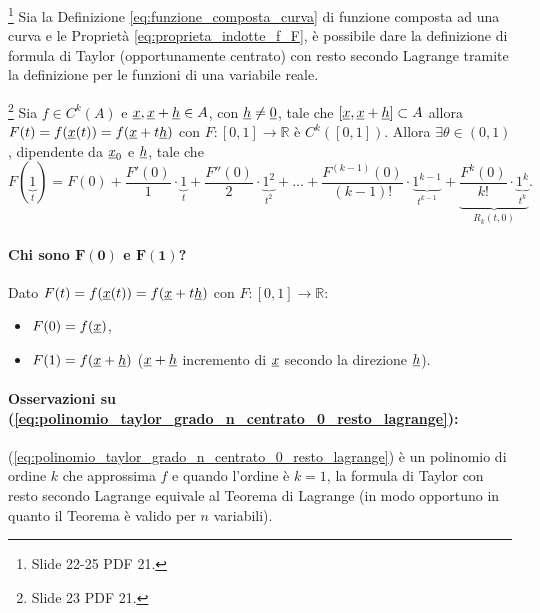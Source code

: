 \footnote{Slide 22-25 PDF 21.}
Sia la Definizione \ref{eq:funzione_composta_curva} di funzione composta ad una curva e le Proprietà \ref{eq:proprieta_indotte_f_F}, è possibile dare la definizione di formula di Taylor (opportunamente centrato) con resto secondo Lagrange tramite la definizione per le funzioni di una variabile reale.

\begin{definition}\footnote{Slide 23 PDF 21.}
	Sia $f\in C^k(A)$ e $\uline x, \uline x+\uline h\in A$, con $\uline h\neq\uline 0$, tale che $[\uline x, \uline x+\uline h] \subset A$ allora $F(t)=f(\uline x(t))=f(\uline x+t\uline h)$ con $F:[0,1]\rightarrow\mathbb{R}$ è $C^k([0,1])$. Allora $\exists\theta\in(0,1)$, dipendente da $\uline x_0$ e $\uline h$, tale che
	\begin{equation}\label{eq:polinomio_taylor_grado_n_centrato_0_resto_lagrange}
		F(\underbrace{1}_t) = F(0) + \frac{F'(0)}{1}\cdot \underbrace{1}_t + \frac{F''(0)}{2}\cdot \underbrace{1^2}_{t^2}  + \hdots + \frac{F^{(k-1)}(0)}{(k-1)!}\cdot \underbrace{1^{k-1}}_{t^{k-1}} + \underbrace{\frac{F^k(0)}{k!}\cdot \underbrace{1^k}_{t^{k}}}_{R_k(t,0)}.
	\end{equation}
\end{definition}
\paragraph{Chi sono $\boldsymbol{F(0)}$ e $\boldsymbol{F(1)}$?} Dato $F(t)=f(\uline x(t))=f(\uline x+t\uline h)$ con $F:[0,1]\rightarrow\mathbb{R}$:
\begin{itemize}
	\item $F(0)=f(\uline x)$,
	\item $F(1)=f(\uline x+\uline h)$ ($\uline x+\uline h$ incremento di $\uline x$ secondo la direzione $\uline h$).
\end{itemize}

\paragraph{Osservazioni su (\ref{eq:polinomio_taylor_grado_n_centrato_0_resto_lagrange}):} (\ref{eq:polinomio_taylor_grado_n_centrato_0_resto_lagrange}) è un polinomio di ordine $k$ che approssima $f$ e quando l'ordine è $k=1$, la formula di Taylor con resto secondo Lagrange equivale al Teorema di Lagrange (in modo opportuno in quanto il Teorema è valido per $n$ variabili).

